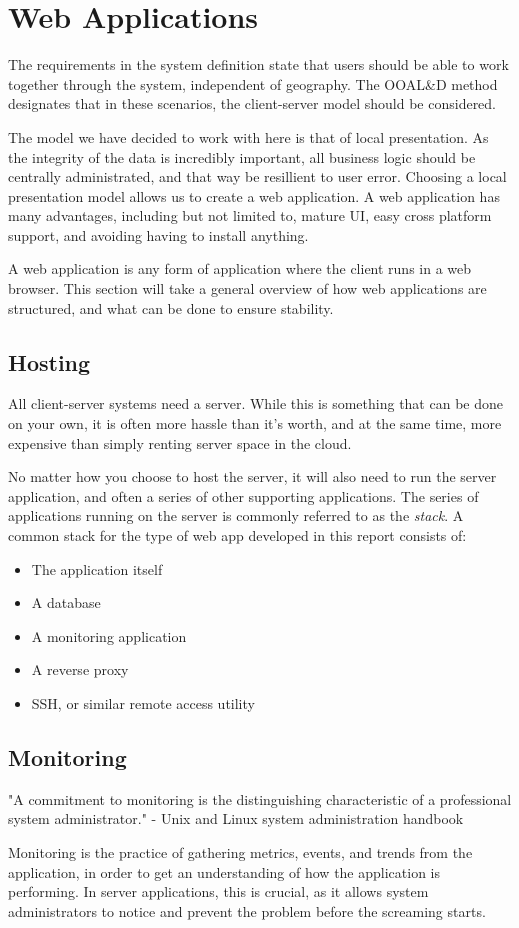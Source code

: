 \section{Web Applications}
The requirements in the system definition state that users should be able to work together through the system, independent of geography. The OOAL\&D method designates that in these scenarios, the client-server model should be considered. %

The model we have decided to work with here is that of local presentation. As the integrity of the data is incredibly important, all business logic should be centrally administrated, and that way be resillient to user error.
Choosing a local presentation model allows us to create a web application. A web application has many advantages, including but not limited to, mature UI, easy cross platform support, and avoiding having to install anything.

A web application is any form of application where the client runs in a web browser. This section will take a general overview of how web applications are structured, and what can be done to ensure stability.

\subsection{Hosting}
All client-server systems need a server. While this is something that can be done on your own, it is often more hassle than it's worth, and at the same time, more expensive than simply renting server space in the cloud.

No matter how you choose to host the server, it will also need to run the server application, and often a series of other supporting applications. The series of applications running on the server is commonly referred to as the \textit{stack}. A common stack for the type of web app developed in this report consists of:
\begin{itemize}
\item The application itself
\item A database
\item A monitoring application
\item A reverse proxy
\item SSH, or similar remote access utility
\end{itemize}
\subsection{Monitoring}
"A commitment to monitoring is the distinguishing characteristic of a professional system administrator." - Unix and Linux system administration handbook

Monitoring is the practice of gathering metrics, events, and trends from the application, in order to get an understanding of how the application is performing.
In server applications, this is crucial, as it allows system administrators to notice and prevent the problem before the screaming starts.

